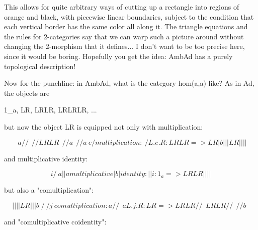 This allows for quite arbitrary ways of cutting up a rectangle into
regions of orange and black, with piecewise linear boundaries, subject
to the condition that each vertical border has the same color all along
it.  The triangle equations and the rules for 2-categories say that we
can warp such a picture around without changing the 2-morphism that it
defines... I don't want to be too precise here, since it would be
boring.  Hopefully you get the idea: AmbAd has a purely topological 
description!  

Now for the punchline: in AmbAd, what is the category hom(a,a) like?
As in Ad, the objects are

1_{a}, LR, LRLR, LRLRLR, ...

but now the object LR is equipped not only with multiplication:

$$
                     \  \    a    /  /  
                      \  \       /  /
                       L  R     L  R
                        \  \   /  /
                  a      \  \ /  /      a      
                          \  e  /                     multiplication:
                           \   /                     L.e.R: LRLR => LR 
                           | b |
                           |   |
                           L   R
                           |   |
                           |   |   
$$
    
and multiplicative identity:

$$
                             i
                            / \
                    a      |   |    a                 multiplicative
                           | b |                         identity:
                           |   |                        i: 1_{a} => LR
                           L   R   
                           |   |
                           |   |

$$
    
but also a "comultiplication":
 
$$
                           |   |
                           |   |   
                           L   R
                           |   |
                           | b |
                           /   \                           
                          /  j  \                    comultiplication:
                  a      /  / \  \      a            L.j.R: LR => LRLR
                        /  /   \  \
                       L  R     L  R
                      /  /       \  \
                     /  /    b    \  \ 
$$
    
and "comultiplicative coidentity":



